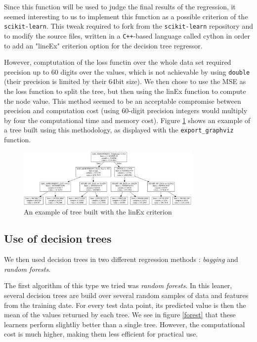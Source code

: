 \documentclass[a4paper,10pt]{article}
\begin{document}
  Since this function will be used to judge the final results of the regression, it seemed interesting to us to implement this function as a possible criterion of the {\tt scikit-learn}. This tweak required to fork from the {\tt scikit-learn} repository and to modify the source files, written in a {\tt C++}-based language called cython in order to add an "lineEx" criterion option for the decision tree regressor.

  However, comptutation of the loss functin over the whole data set required precision up to 60 digits over the values, which is not achievable by using {\tt double} (their precision is limited by their 64bit size). We then chose to use the MSE as the loss function to split the tree, but then using the linEx function to compute the node value. This method seemed to be an acceptable compromise between precision and computation cost (using 60-digit precision integers would multiply by four the computational time and memory cost). Figure \ref{tree_example} shows an example of a tree built using this methodology, as displayed with the {\tt export\_graphviz} function.
  \begin{figure}
    \centering
    \includegraphics[width=0.8\textwidth]{graphics/tree.png}
    \caption{An example of tree built with the linEx criterion}
      \label{tree_example}
  \end{figure}

  \subsection{Use of decision trees}

  We then used decision trees in two different regression methods : \emph{bagging} and \emph{random forests}.

  The first algorithm of this type we tried was \emph{random forests}. In this leaner, several decision trees are build over several random samples of data and features from the training date. For every test data point, its predicted value is then the mean of the values returned by each tree. We see in figure \ref{forest} that these learners perform slightliy better than a single tree. However, the computational cost is much higher, making them less efficient for practical use.
\end{document}
